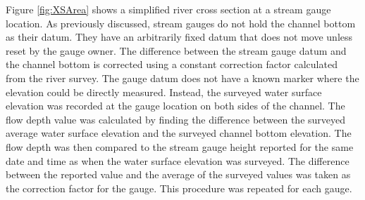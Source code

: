 Figure \ref{fig:XSArea} shows a simplified river cross section at a stream gauge location.  As previously discussed, stream gauges do not hold the channel bottom as their datum.  They have an arbitrarily fixed datum that does not move unless reset by the gauge owner.  The difference between the stream gauge datum and the channel bottom is corrected using a constant correction factor calculated from the river survey.  The gauge datum does not have a known marker where the elevation could be directly measured.  Instead, the surveyed water surface elevation was recorded at the gauge location on both sides of the channel.  The flow depth value was calculated by finding the difference between the surveyed average water surface elevation and the surveyed channel bottom elevation.  The flow depth was then compared to the stream gauge height reported for the same date and time as when the water surface elevation was surveyed.  The difference between the reported value and the average of the surveyed values was taken as the correction factor for the gauge.  This procedure was repeated for each gauge.

